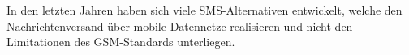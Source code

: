 \documentclass[german,12pt,a4paper]{article}
\begin{document}
In den letzten Jahren haben sich viele SMS-Alternativen entwickelt, welche den Nachrichtenversand über mobile Datennetze realisieren und 
nicht den Limitationen des GSM-Standards unterliegen.



\end{document}

